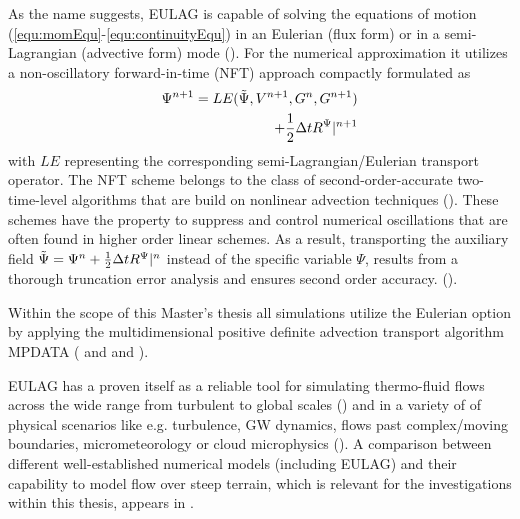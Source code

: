 As the name suggests, EULAG is capable of solving the equations of motion (\ref{equ:momEqu}-\ref{equ:continuityEqu}) in an Eulerian (flux form) or in a semi-Lagrangian (advective form) mode (\cite{smolarkiewicz_forward--time_1997}). For the numerical approximation it utilizes a non-oscillatory forward-in-time (NFT) approach compactly formulated as
%
\begin{equation}
\begin{aligned}
    \Psi^{n+1} = LE(\Tilde{\Psi}, V^{n+1}, G^n, G^{n+1}) \\
    + \frac{1}{2} \Delta t R^{\Psi} |^{n+1}
    \label{equ:NFTscheme}
\end{aligned}
\end{equation}
%
with $LE$ representing the corresponding semi-Lagrangian/Eulerian transport operator. The NFT scheme belongs to the class of second-order-accurate two-time-level algorithms that are build on nonlinear advection techniques (\cite{prusa_eulag_2008}). These schemes have the property to suppress and control numerical oscillations that are often found in higher order linear schemes. As a result, transporting the auxiliary field $\Tilde{\Psi} = \Psi^n + \frac{1}{2} \Delta t R^{\Psi}|^n$ instead of the specific variable $\Psi$, results from a thorough truncation error analysis and ensures second order accuracy. (\cite{smolarkiewicz_forward--time_1997}).

Within the scope of this Master's thesis all simulations utilize the Eulerian option by applying the multidimensional positive definite advection transport algorithm MPDATA (\cite{smolarkiewicz_mpdata_1998} and  and \cite{smolarkiewicz_multidimensional_2006}).

EULAG has a proven itself as a reliable tool for simulating thermo-fluid flows across the wide range from turbulent to global scales (\cite{prusa_all-scale_2003}) and in a variety of of physical scenarios like e.g. turbulence, GW dynamics, flows past complex/moving boundaries, micrometeorology or cloud microphysics (\cite{prusa_eulag_2008}). A comparison between different well-established numerical models (including EULAG) and their capability to model flow over steep terrain, which is relevant for the investigations within this thesis, appears in \textcite{doyle_intercomparison_2011}.




